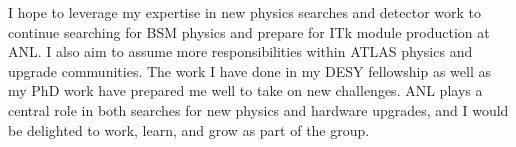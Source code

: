 \documentclass[a4paper]{article}
\begin{document}
I hope to leverage my expertise in new physics searches and detector work to continue searching for BSM physics and prepare for ITk
module production at ANL. I also aim to assume more responsibilities within ATLAS physics and upgrade communities. The work I have done
in my DESY fellowship as well as my PhD work have prepared me well to take on new challenges.
ANL plays a central role in both searches for new physics and hardware upgrades, and I would be delighted to work,
learn, and grow as part of the group.



%
\end{document}
